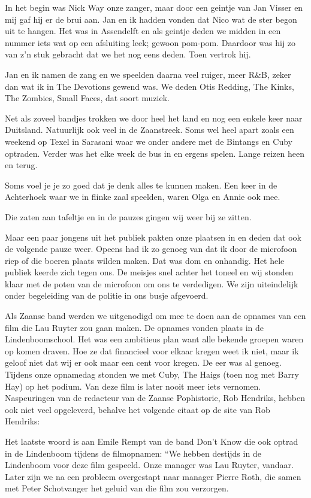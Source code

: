 \documentclass[10pt,twoside,openright]{memoir}
\begin{document}
In het begin was Nick Way onze zanger, maar door een geintje van Jan Visser en mij gaf hij er de brui aan. Jan en ik hadden vonden dat Nico wat de ster begon uit te hangen. Het was in Assendelft en als geintje deden we midden in een nummer iets wat op een afsluiting leek; gewoon pom-pom. Daardoor was hij zo van z’n stuk gebracht dat we het nog eens deden. Toen vertrok hij.

Jan en ik namen de zang en we speelden daarna veel ruiger, meer R&B, zeker dan wat ik in The Devotions gewend was. We deden Otis Redding, The Kinks, The Zombies, Small Faces, dat soort muziek.

Net als zoveel bandjes trokken we door heel het land en nog een enkele keer naar Duitsland. Natuurlijk ook veel in de Zaanstreek. Soms wel heel apart zoals een weekend op Texel in Sarasani waar we onder andere met de Bintangs en Cuby optraden. Verder was het elke week de bus in en ergens spelen. Lange reizen heen en terug.

Soms voel je je zo goed dat je denk alles te kunnen maken. 
Een keer in de Achterhoek waar we in flinke zaal speelden, waren Olga en Annie ook mee. 

Die zaten aan tafeltje en in de pauzes gingen wij weer bij ze zitten. 

Maar een paar jongens uit het publiek pakten onze plaatsen in en deden dat ook de volgende pauze weer. Opeens had ik zo genoeg van dat ik door de microfoon riep of die boeren plaats wilden maken. Dat was dom en onhandig. Het hele publiek keerde zich tegen ons. De meisjes snel achter het toneel en wij stonden klaar met de poten van de microfoon om ons te verdedigen. We zijn uiteindelijk onder begeleiding van de politie in ons busje afgevoerd.

Als Zaanse band werden we uitgenodigd om mee te doen aan de opnames van een film die Lau Ruyter zou gaan maken. De opnames vonden plaats in de Lindenboomschool. Het was een ambitieus plan want alle bekende groepen waren op komen draven. Hoe ze dat financieel voor elkaar kregen weet ik niet, maar ik geloof niet dat wij er ook maar een cent voor kregen. De eer was al genoeg. Tijdens onze opnamedag stonden we met Cuby, The Haigs (toen nog met Barry Hay) op het podium. Van deze film is later nooit meer iets vernomen. Naspeuringen van de redacteur van de Zaanse Pophistorie, Rob Hendriks, hebben ook niet veel opgeleverd, behalve het volgende citaat op de site van Rob Hendriks: 

Het laatste woord is aan Emile Rempt van de band Don’t Know die ook optrad in de Lindenboom tijdens de filmopnamen: “We hebben destijds in de Lindenboom voor deze film gespeeld. Onze manager was Lau Ruyter, vandaar. Later zijn we na een probleem overgestapt naar manager Pierre Roth, die samen met Peter Schotvanger het geluid van die film zou verzorgen.
\end{document}
